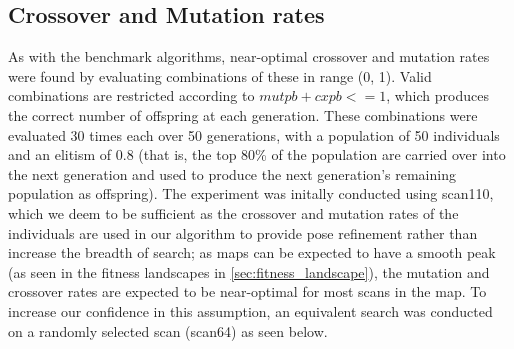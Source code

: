 \documentclass[authoryearcitations]{UoYCSproject}
\begin{document}
\subsection{Crossover and Mutation rates}
\label{subsec:elite_cxpb_mupb}
As with the benchmark algorithms, near-optimal crossover and mutation rates were found by evaluating combinations of these in range (0, 1). Valid combinations are restricted according to $mutpb + cxpb <= 1$, which produces the correct number of offspring at each generation. These combinations were evaluated 30 times each over 50 generations, with a population of 50 individuals and an elitism of 0.8 (that is, the top 80\% of the population are carried over into the next generation and used to produce the next generation's remaining population as offspring). The experiment was initally conducted using scan110, which we deem to be sufficient as the crossover and mutation rates of the individuals are used in our algorithm to provide pose refinement rather than increase the breadth of search; as maps can be expected to have a smooth peak (as seen in the fitness landscapes in \autoref{sec:fitness_landscape}), the mutation and crossover rates are expected to be near-optimal for most scans in the map. To increase our confidence in this assumption, an equivalent search was conducted on a randomly selected scan (scan64) as seen below.
\end{document}

